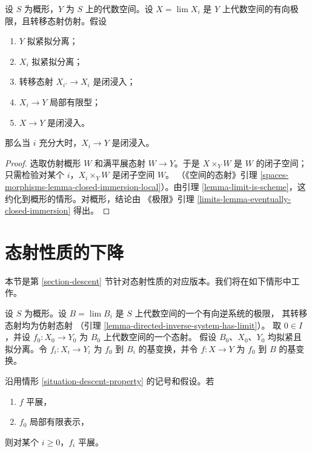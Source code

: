 \begin{lemma}
\label{lemma-eventually-closed-immersion}
设 $S$ 为概形，$Y$ 为 $S$ 上的代数空间。设 $X=\lim X_i$ 是 $Y$
上代数空间的有向极限，且转移态射仿射。假设
\begin{enumerate}
\item $Y$ 拟紧拟分离；
\item $X_i$ 拟紧拟分离；
\item 转移态射 $X_{i'}\to X_i$ 是闭浸入；
\item $X_i\to Y$ 局部有限型；
\item $X\to Y$ 是闭浸入。
\end{enumerate}
那么当 $i$ 充分大时，$X_i\to Y$ 是闭浸入。
\end{lemma}

\begin{proof}
选取仿射概形 $W$ 和满平展态射 $W\to Y$。于是 $X\times_YW$ 是 $W$
的闭子空间；只需检验对某个 $i$，$X_i\times_YW$ 是闭子空间 $W$。
（《空间的态射》引理
\ref{spaces-morphisms-lemma-closed-immersion-local}）。由引理
\ref{lemma-limit-is-scheme}，这约化到概形的情形。对概形，结论由
《极限》引理 \ref{limits-lemma-eventually-closed-immersion} 得出。
\end{proof}

















\section{态射性质的下降}
\label{section-descent-of-properties}

\noindent
本节是第 \ref{section-descent} 节针对态射性质的对应版本。我们将在如下情形中工作。

\begin{situation}
\label{situation-descent-property}
设 $S$ 为概形。设 $B = \lim B_i$ 是 $S$ 上代数空间的一个有向逆系统的极限，
其转移态射均为仿射态射
（引理 \ref{lemma-directed-inverse-system-has-limit}）。
取 $0 \in I$，并设 $f_0 : X_0 \to Y_0$ 为 $B_0$ 上代数空间的一个态射。
假设 $B_0$、$X_0$、$Y_0$ 均拟紧且拟分离。令
$f_i : X_i \to Y_i$ 为 $f_0$ 到 $B_i$ 的基变换，并令
$f : X \to Y$ 为 $f_0$ 到 $B$ 的基变换。
\end{situation}

\begin{lemma}
\label{lemma-descend-etale}
沿用情形 \ref{situation-descent-property} 的记号和假设。若
\begin{enumerate}
\item $f$ 平展，
\item $f_0$ 局部有限表示，
\end{enumerate}
则对某个 $i \geq 0$，$f_i$ 平展。
\end{lemma}

